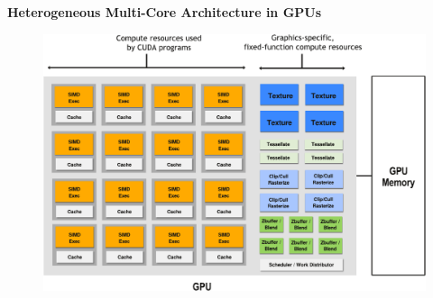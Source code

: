 \begin{flushleft}
    \textcolor{Green3}{ \textbf{Heterogeneous Multi-Core Architecture in GPUs}}
\end{flushleft}
\begin{figure}[!htp]
    \centering
    \includegraphics[width=\textwidth]{img/heterogeneous-gpus-1.pdf}
\end{figure}
